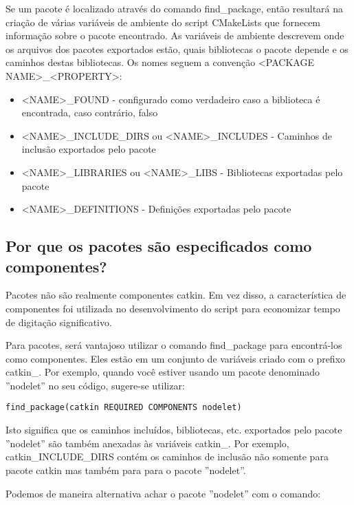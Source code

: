 Se um pacote é localizado através do comando find\_package, então resultará na criação de várias variáveis de ambiente do script CMakeLists que fornecem informação sobre o pacote encontrado. As variáveis de ambiente descrevem onde os arquivos dos pacotes exportados estão, quais bibliotecas o pacote depende e os caminhos destas bibliotecas. Os nomes seguem a convenção <PACKAGE NAME>\_<PROPERTY>:

\begin{itemize}
	\setlength{\itemsep}{1pt}
	\setlength{\parskip}{0pt}
	\setlength{\parsep}{0pt}
	\item[]<NAME>\_FOUND - configurado como verdadeiro caso a biblioteca é encontrada, caso contrário, falso
	\item[]<NAME>\_INCLUDE\_DIRS ou <NAME>\_INCLUDES - Caminhos de inclusão exportados pelo pacote
	\item[]<NAME>\_LIBRARIES ou <NAME>\_LIBS - Bibliotecas exportadas pelo pacote
	\item[]<NAME>\_DEFINITIONS - Definições exportadas pelo pacote
\end{itemize}


\subsection{Por que os pacotes são especificados como componentes?}

Pacotes não são realmente componentes catkin. Em vez disso, a característica de componentes foi utilizada no desenvolvimento do script para economizar tempo de digitação significativo.

Para pacotes, será vantajoso utilizar o comando find\_package para encontrá-los como componentes. Eles estão em um conjunto de variáveis criado com o prefixo catkin\_. Por exemplo, quando você estiver usando um pacote denominado ''nodelet'' no seu código, sugere-se utilizar:

\begin{verbatim} 
find_package(catkin REQUIRED COMPONENTS nodelet)
\end{verbatim}

Isto significa que os caminhos incluídos, bibliotecas, etc. exportados pelo pacote ''nodelet'' são também anexadas às variáveis catkin\_. Por exemplo, catkin\_INCLUDE\_DIRS contém os caminhos de inclusão não somente para pacote catkin mas também para para o pacote ''nodelet''. 

Podemos de maneira alternativa achar o pacote ''nodelet'' com o comando:

